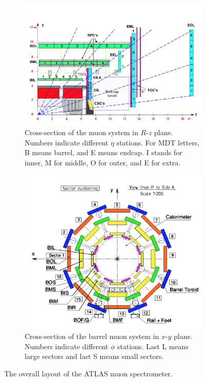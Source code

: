 \begin{figure}[htbp!]
\centering
\captionsetup{justification=centering}
    \begin{subfigure}[b]{0.5\textwidth}
        \includegraphics[width=\textwidth]{figures/detector/MS_rz}
        \caption{Cross-section of the muon system in $R$-$z$ plane. Numbers indicate different $\eta$ stations. For MDT letters, B means barrel, and E means endcap. I stands for inner, M for middle, O for outer, and E for extra.}
        \label{fig:MS_rz}
    \end{subfigure}
    \quad
    \begin{subfigure}[b]{0.3\textwidth}
        \includegraphics[width=\textwidth]{figures/detector/MS_phi}
        \caption{Cross-section of the barrel muon system in $x$-$y$ plane. Numbers indicate different $\phi$ stations. Last L means large sectors and last S means small sectors.}
        \label{fig:MS_phi}
    \end{subfigure}
\caption{The overall layout of the ATLAS muon spectrometer.}
\label{fig:Det_MS}
\end{figure}


